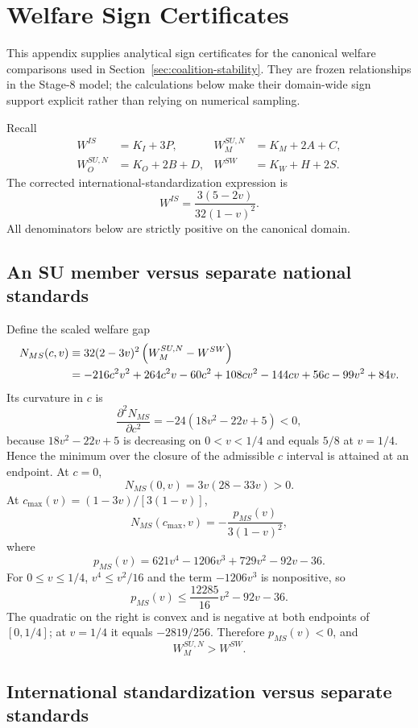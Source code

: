 \section{Welfare Sign Certificates}
\label{app:welfare}

This appendix supplies analytical sign certificates for the canonical welfare comparisons used in Section~\ref{sec:coalition-stability}. They are frozen relationships in the Stage-8 model; the calculations below make their domain-wide sign support explicit rather than relying on numerical sampling.

Recall
\begin{align*}
W^{IS}&=K_I+3P,
& W_M^{SU,N}&=K_M+2A+C,\\
W_O^{SU,N}&=K_O+2B+D,
& W^{SW}&=K_W+H+2S.
\end{align*}
The corrected international-standardization expression is
\[
W^{IS}=\frac{3(5-2v)}{32(1-v)^2}.
\]
All denominators below are strictly positive on the canonical domain.

\subsection{An SU member versus separate national standards}

Define the scaled welfare gap
\begin{align}
N_{MS}(c,v)
&\equiv 32(2-3v)^2\left(W_M^{SU,N}-W^{SW}\right)\notag\\
&=-216c^2v^2+264c^2v-60c^2
+108cv^2-144cv+56c
-99v^2+84v.
\label{eq:appendix-n-ms}
\end{align}
Its curvature in $c$ is
\[
\frac{\partial^2N_{MS}}{\partial c^2}
=-24(18v^2-22v+5)<0,
\]
because $18v^2-22v+5$ is decreasing on $0<v<1/4$ and equals $5/8$ at $v=1/4$. Hence the minimum over the closure of the admissible $c$ interval is attained at an endpoint. At $c=0$,
\[
N_{MS}(0,v)=3v(28-33v)>0.
\]
At $c_{\max}(v)=(1-3v)/[3(1-v)]$,
\[
N_{MS}(c_{\max},v)
=-\frac{p_{MS}(v)}{3(1-v)^2},
\]
where
\[
p_{MS}(v)=621v^4-1206v^3+729v^2-92v-36.
\]
For $0\le v\le1/4$, $v^4\le v^2/16$ and the term $-1206v^3$ is nonpositive, so
\[
p_{MS}(v)
\le \frac{12285}{16}v^2-92v-36.
\]
The quadratic on the right is convex and is negative at both endpoints of $[0,1/4]$; at $v=1/4$ it equals $-2819/256$. Therefore $p_{MS}(v)<0$, and
\begin{equation}
\boxed{W_M^{SU,N}>W^{SW}.}
\label{eq:appendix-su-member-gt-sw}
\end{equation}

\subsection{International standardization versus separate standards}

